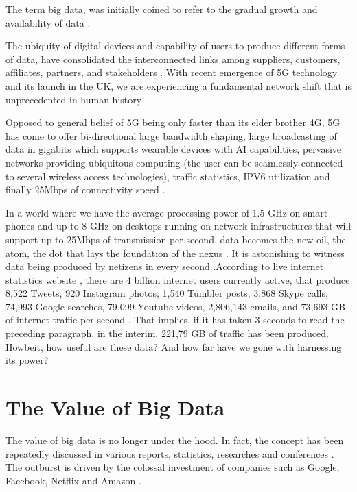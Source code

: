 The term big data, was initially coined to refer to the gradual growth and availability of data \cite{lycett2013datafication}.

The ubiquity of digital devices and capability of users to produce different forms of data, have consolidated the interconnected links among suppliers, customers, affiliates, partners, and stakeholders \cite{Bughin2016}. With recent emergence of 5G technology and its launch in the UK, we are experiencing a fundamental network shift that is unprecedented in human history \cite{ahmad20205g}

Opposed to general belief of 5G being only faster than its elder brother 4G, 5G has come to offer bi-directional large bandwidth shaping, large broadcasting of data in gigabits which supports wearable devices with AI capabilities, pervasive networks providing ubiquitous computing (the user can be seamlessly connected to several wireless access technologies), traffic statistics, IPV6 utilization and finally 25Mbps of connectivity speed \cite{Gohil2013}.

In a world where we have the average processing power of 1.5 GHz on smart phones and up to 8 GHz on desktops running on network infrastructures that will support up to 25Mbps of transmission per second, data becomes the new oil, the atom, the dot that lays the foundation of the nexus \cite{Rad2017}. It is astonishing to witness data being produced by netizens in every second .According to live internet statistics website , there are 4 billion internet users currently active, that produce 8,522 Tweets, 920 Instagram photos, 1,540 Tumbler posts, 3,868 Skype calls, 74,993 Google searches, 79,099 Youtube videos, 2,806,143 emails, and 73,693 GB of internet traffic per second \cite{Stats2017}. That implies, if it has taken 3 seconds to read the preceding paragraph, in the interim, 221,79 GB of traffic has been produced. Howbeit, how useful are these data? And how far have we gone with harnessing its power?


\section{The Value of Big Data}\label{sec:The Value of Big Data}

The value of big data is no longer under the hood. In fact, the concept has been repeatedly discussed in various reports, statistics, researches and conferences \cite{Chen2012}. The outburst is driven by the colossal investment of companies such as Google, Facebook, Netflix and Amazon \cite{Rada2017}.

